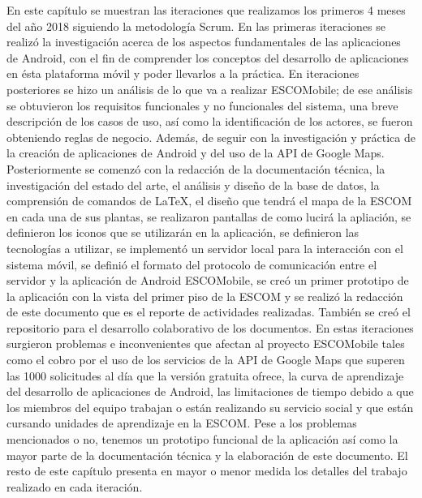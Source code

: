 \noindent
En este capítulo se muestran las iteraciones que realizamos los primeros 4 meses del año 2018 siguiendo la metodología Scrum. 
En las primeras iteraciones se realizó la investigación acerca de los aspectos fundamentales de las aplicaciones de Android, con el fin de comprender los conceptos del desarrollo de aplicaciones en ésta plataforma móvil y poder llevarlos a la práctica.
En iteraciones posteriores se hizo un análisis de lo que va a realizar ESCOMobile; de ese análisis se obtuvieron los requisitos funcionales y no funcionales del sistema, una breve descripción de los casos de uso, así como la identificación de los actores, se fueron obteniendo reglas de negocio. Además, de seguir con la investigación y práctica de la creación de aplicaciones de Android y del uso de la API de Google Maps. Posteriormente se comenzó con la redacción de la documentación técnica, la investigación del estado del arte, el análisis y diseño de la base de datos, la comprensión de comandos de LaTeX, el diseño que tendrá el mapa de la ESCOM en cada una de sus plantas, se realizaron pantallas de como lucirá la apliación, se definieron los iconos que se utilizarán en la aplicación, se definieron las tecnologías a utilizar, se implementó un servidor local para la interacción con el sistema móvil, se definió el formato del protocolo de comunicación entre el servidor y la aplicación de Android ESCOMobile, se creó un primer prototipo de la aplicación con la vista del primer piso de la ESCOM y se realizó la redacción de este documento que es el reporte de actividades realizadas. También se creó el repositorio para el desarrollo colaborativo de los documentos. En estas iteraciones surgieron problemas e inconvenientes que afectan al proyecto ESCOMobile tales como el cobro por el uso de los servicios de la API de Google Maps que superen las 1000 solicitudes al día que la versión gratuita ofrece, la curva de aprendizaje del desarrollo de aplicaciones de Android, las limitaciones de tiempo debido a que los miembros del equipo trabajan o están realizando su servicio social y que están cursando unidades de aprendizaje en la ESCOM. Pese a los problemas mencionados o no, tenemos un prototipo funcional de la aplicación así como la mayor parte de la documentación técnica y la elaboración de este documento. El resto de este capítulo presenta en mayor o menor medida los detalles del trabajo realizado en cada iteración.

